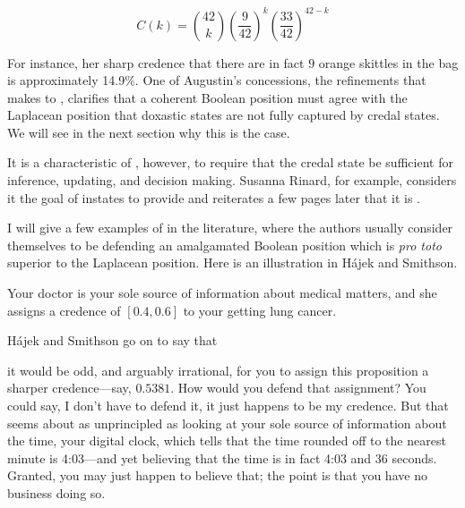 \documentclass[phd,12pt,oneside]{ubcthesis}
\begin{document}
\begin{equation}
  \label{eq:bern}
  C(k)=\binom{42}{k}\left(\frac{9}{42}\right)^{k}\left(\frac{33}{42}\right)^{42-k}
\end{equation}

{\noindent}For instance, her sharp credence that there are in fact $9$ orange
skittles in the bag is approximately 14.9\%. One of Augustin's
concessions, the refinements that {\augustin} makes to {\anderson},
clarifies that a coherent Boolean position must agree with the
Laplacean position that doxastic states are not fully captured by
credal states. We will see in the next section why this is the case.

It is a characteristic of {\anderson}, however, to require that
the credal state be sufficient for inference, updating, and decision
making. Susanna Rinard, for example, considers it the goal of instates
to provide   and reiterates a few pages later
that it is 
.

I will give a few examples of {\anderson} in the literature, where the
authors usually consider themselves to be defending an amalgamated
Boolean position which is \emph{pro toto} superior to the Laplacean
position. Here is an illustration in H{\'a}jek and Smithson.

\begin{quotex}
  \label{ex:crude} Your doctor is your
  sole source of information about medical matters, and she assigns a
  credence of $[0.4,0.6]$ to your getting lung cancer.
\end{quotex}

H{\'a}jek and Smithson go on to say that 

\begin{quotex}
  it would be odd, and arguably irrational, for you to assign this
  proposition a sharper credence---say, $0.5381$. How would you defend
  that assignment? You could say, I don't have to defend it, it just
  happens to be my credence. But that seems about as unprincipled as
  looking at your sole source of information about the time, your
  digital clock, which tells that the time rounded off to the nearest
  minute is 4:03---and yet believing that the time is in fact 4:03 and
  36 seconds. Granted, you may just happen to believe that; the point
  is that you have no business doing so.
\end{quotex}
\end{document}
